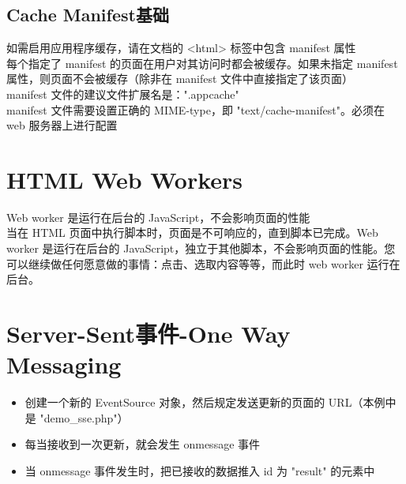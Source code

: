 \documentclass[10pt,UTF8]{ctexart}
\begin{document}
\subsection{Cache Manifest基础}
如需启用应用程序缓存，请在文档的 <html> 标签中包含 manifest 属性\\
每个指定了 manifest 的页面在用户对其访问时都会被缓存。如果未指定 manifest 属性，则页面不会被缓存（除非在 manifest 文件中直接指定了该页面）\\
manifest 文件的建议文件扩展名是：".appcache"\\
manifest 文件需要设置正确的 MIME-type，即 "text/cache-manifest"。必须在 web 服务器上进行配置

\section{HTML Web Workers}
Web worker 是运行在后台的 JavaScript，不会影响页面的性能\\
当在 HTML 页面中执行脚本时，页面是不可响应的，直到脚本已完成。Web worker 是运行在后台的 JavaScript，独立于其他脚本，不会影响页面的性能。您可以继续做任何愿意做的事情：点击、选取内容等等，而此时 web worker 运行在后台。
\section{Server-Sent事件-One Way Messaging}
\begin{itemize}
\item 创建一个新的 EventSource 对象，然后规定发送更新的页面的 URL（本例中是 "demo_sse.php"）
\item 每当接收到一次更新，就会发生 onmessage 事件
\item 当 onmessage 事件发生时，把已接收的数据推入 id 为 "result" 的元素中
\end{itemize}
\end{document}
